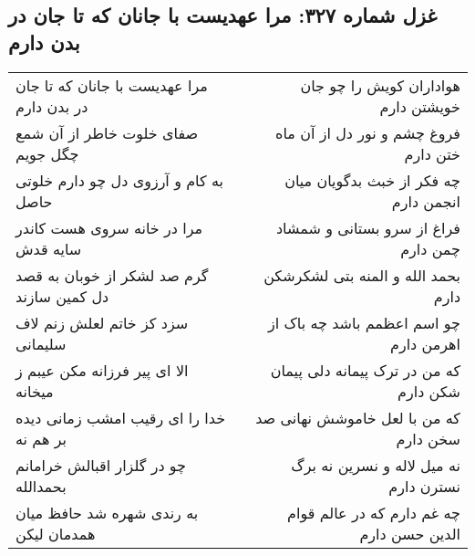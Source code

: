 \begin{center}
\section*{غزل شماره ۳۲۷: مرا عهدیست با جانان که تا جان در بدن دارم}
\label{sec:sh327}
\begin{longtable}{l p{0.5cm} r}
مرا عهدیست با جانان که تا جان در بدن دارم
&&
هواداران کویش را چو جان خویشتن دارم
\\
صفای خلوت خاطر از آن شمع چگل جویم
&&
فروغ چشم و نور دل از آن ماه ختن دارم
\\
به کام و آرزوی دل چو دارم خلوتی حاصل
&&
چه فکر از خبث بدگویان میان انجمن دارم
\\
مرا در خانه سروی هست کاندر سایه قدش
&&
فراغ از سرو بستانی و شمشاد چمن دارم
\\
گرم صد لشکر از خوبان به قصد دل کمین سازند
&&
بحمد الله و المنه بتی لشکرشکن دارم
\\
سزد کز خاتم لعلش زنم لاف سلیمانی
&&
چو اسم اعظمم باشد چه باک از اهرمن دارم
\\
الا ای پیر فرزانه مکن عیبم ز میخانه
&&
که من در ترک پیمانه دلی پیمان شکن دارم
\\
خدا را ای رقیب امشب زمانی دیده بر هم نه
&&
که من با لعل خاموشش نهانی صد سخن دارم
\\
چو در گلزار اقبالش خرامانم بحمدالله
&&
نه میل لاله و نسرین نه برگ نسترن دارم
\\
به رندی شهره شد حافظ میان همدمان لیکن
&&
چه غم دارم که در عالم قوام الدین حسن دارم
\\
\end{longtable}
\end{center}
